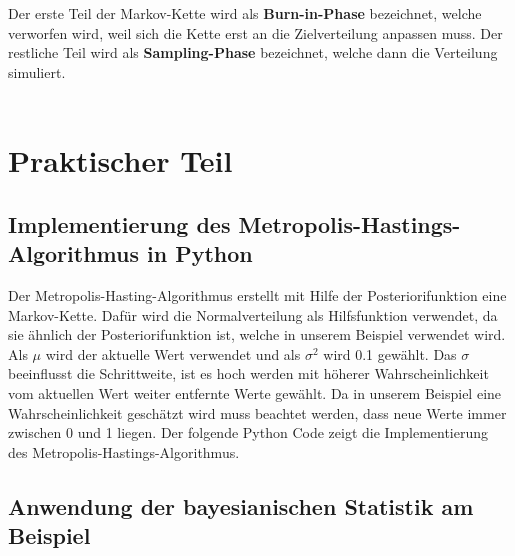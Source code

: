 \documentclass[a4paper,12pt]{article}
\begin{document}
Der erste Teil der Markov-Kette wird als \textbf{Burn-in-Phase} bezeichnet, welche verworfen wird, weil sich die Kette erst an die Zielverteilung anpassen muss. Der restliche Teil wird als \textbf{Sampling-Phase} bezeichnet, welche dann die Verteilung simuliert. \parencite[226f.]{HandbookMonteCarloMethods} \\\\

\newpage

\section{Praktischer Teil}

\subsection{Implementierung des Metropolis-Hastings-Algorithmus in Python}
Der Metropolis-Hasting-Algorithmus erstellt mit Hilfe der Posteriorifunktion eine Markov-Kette. Dafür wird die Normalverteilung als Hilfsfunktion verwendet, da sie ähnlich der Posteriorifunktion ist, welche in unserem Beispiel verwendet wird. Als $\mu$ wird der aktuelle Wert verwendet und als $\sigma^2$ wird 0.1 gewählt. Das $\sigma$ beeinflusst die Schrittweite, ist es hoch werden mit höherer Wahrscheinlichkeit vom aktuellen Wert weiter entfernte Werte gewählt. Da in unserem Beispiel eine Wahrscheinlichkeit geschätzt wird muss beachtet werden, dass neue Werte immer zwischen 0 und 1 liegen. Der folgende Python Code zeigt die Implementierung des Metropolis-Hastings-Algorithmus. 

\newpage

\subsection{Anwendung der bayesianischen Statistik am Beispiel}
\end{document}
